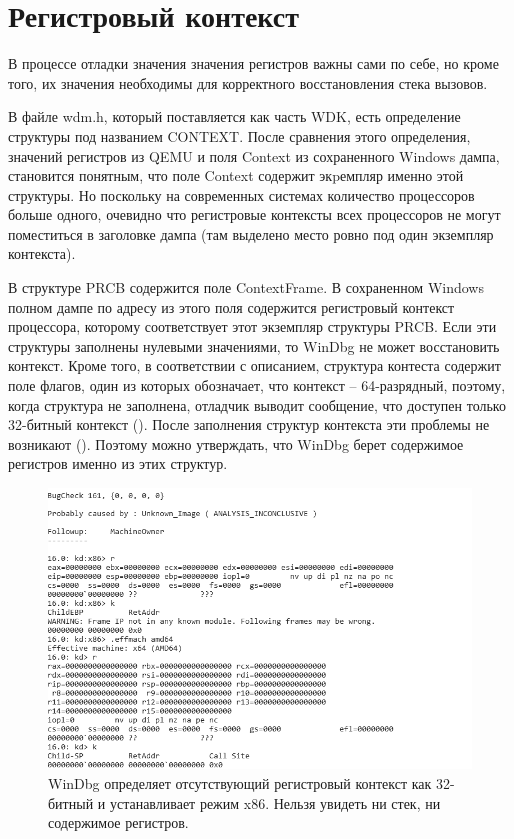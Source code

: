 \documentclass{mipt-thesis-bs}
\begin{document}
\section*{Регистровый контекст}

В процессе отладки значения значения регистров важны сами по себе, но кроме того, их значения необходимы для корректного восстановления стека вызовов.

В файле wdm.h, который поставляется как часть WDK, есть определение структуры под названием CONTEXT. После сравнения этого определения, значений регистров из QEMU и поля Context из сохраненного Windows дампа, становится понятным, что поле Context содержит экpемпляр именно этой структуры. Но поскольку на современных системах количество процессоров больше одного, очевидно что регистровые контексты всех процессоров не могут поместиться в заголовке дампа (там выделено место ровно под один экземпляр контекста).

В структуре PRCB содержится поле ContextFrame. В сохраненном Windows полном дампе по адресу из этого поля содержится регистровый контекст процессора, которому соответствует этот экземпляр структуры PRCB. Если эти структуры заполнены нулевыми значениями, то WinDbg не может восстановить контекст. Кроме того, в соответствии с описанием, структура контеста содержит поле флагов, один из которых обозначает, что контекст -- 64-разрядный, поэтому, когда структура не заполнена, отладчик выводит сообщение, что доступен только 32-битный контекст (). После заполнения структур контекста эти проблемы не возникают (). Поэтому можно утверждать, что WinDbg берет содержимое регистров именно из этих структур.

\begin{figure}[h]
\begin{center}
    \captionsetup{justification=centering}
    \includegraphics[width=1\textwidth]{ctx1.png}
    \caption{WinDbg определяет отсутствующий регистровый контекст как 32-битный и устанавливает режим x86. Нельзя увидеть ни стек, ни содержимое регистров.}
    \label{fig:ctx1}
\end{center}
\end{figure}
\end{document}
